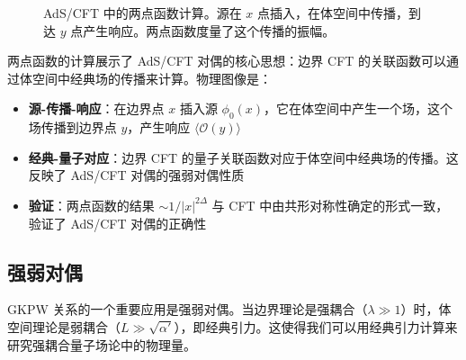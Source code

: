 \begin{figure}[htbp]
\centering
{}
\caption{AdS/CFT 中的两点函数计算。源在 $x$ 点插入，在体空间中传播，到达 $y$ 点产生响应。两点函数度量了这个传播的振幅。}
\label{fig:ads_cft_two_point}
\end{figure}

\begin{example}[两点函数的物理意义]
两点函数的计算展示了 AdS/CFT 对偶的核心思想：边界 CFT 的关联函数可以通过体空间中经典场的传播来计算。物理图像是：
\begin{itemize}
    \item \textbf{源-传播-响应}：在边界点 $x$ 插入源 $\phi_0(x)$，它在体空间中产生一个场，这个场传播到边界点 $y$，产生响应 $\langle \mathcal{O}(y) \rangle$
    \item \textbf{经典-量子对应}：边界 CFT 的量子关联函数对应于体空间中经典场的传播。这反映了 AdS/CFT 对偶的强弱对偶性质
    \item \textbf{验证}：两点函数的结果 $\sim 1/|x|^{2\Delta}$ 与 CFT 中由共形对称性确定的形式一致，验证了 AdS/CFT 对偶的正确性
\end{itemize}
\end{example}

\subsection{强弱对偶}

GKPW 关系的一个重要应用是强弱对偶。当边界理论是强耦合（$\lambda \gg 1$）时，体空间理论是弱耦合（$L \gg \sqrt{\alpha'}$），即经典引力。这使得我们可以用经典引力计算来研究强耦合量子场论中的物理量。

